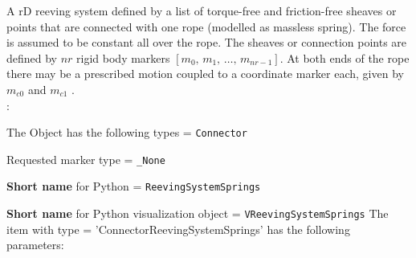 \label{sec:item:ObjectConnectorReevingSystemSprings}
A rD reeving system defined by a list of torque-free and friction-free sheaves or points that are connected with one rope (modelled as massless spring). The force is assumed to be constant all over the rope. The sheaves or connection points are defined by $nr$ rigid body markers $[m_0, \, m_1, \, \ldots, \, m_{nr-1}]$. At both ends of the rope there may be a prescribed motion coupled to a coordinate marker each, given by $m_{c0}$ and $m_{c1}$ .
\vspace{12pt}\\

\noindent {}:
\bi
  \item The Object has the following types = \texttt{Connector}
  \item Requested marker type = \texttt{\_None}
  \item {\bf Short name} for Python = \texttt{ReevingSystemSprings}
  \item {\bf Short name} for Python visualization object = \texttt{VReevingSystemSprings}
\ei\vspace{12pt} \noindent 
The item  with type = 'ConnectorReevingSystemSprings' has the following parameters:
\vspace{-0.5cm}\\
\vspace{-0.5cm}\\
